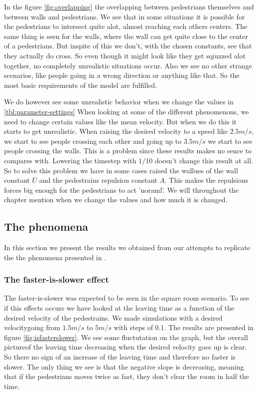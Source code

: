 In the figure \ref{fig:overlapping} the overlapping between pedestrians
themselves and between walls and pedestrians. We see that in some situations
it is possible for the pedestrians to intersect quite alot, almost reaching
each others centers. The same thing is seen for the walls, where the wall
can get quite close to the center of a pedestrians. But inspite of this
we don't, with the chosen constants, see that they actually do cross. So
even though it might look like they get sqiuzzed alot together, no completely
unrealistic situations occur. Also we see no other strange scenarios, like
people going in a wrong direction or anything like that. So the most basic
requirements of the model are fulfilled.

We do however see some unrealistic behavior when we change the values in
\ref{tbl:parameter-settings} When looking at some of the different phenomenons,
we need to change certain values like the mean velocity. But when we do
this it starts to get unrealistic. When raising the desired velocity to
a speed like $2.5m/s$, we start to see people crossing each other and going
up to $3.5m/s$ we start to see people crossing the walls. This is a problem
since these results makes no sence to compares with. Lowering the timestep
with $1/10$ doesn't change this result at all. So to solve this problem we
have in some cases raised the wallues of the wall constant $U$ and the
pedestrains repulsion constant $A$. This makes the repulsions forces
big enough for the pedestrians to act 'noraml'. We will throughout the
chapter mention when we change the values and how much it is changed.

\subsection{The phenomena}\label{subsec:ThePhenomena}
In this section we present the results we obtained from our attempts
to replicate the the phenomena presented in \cite{self-org}.

\subsubsection{The faster-is-slower effect}
The faster-is-slower was expected to be seen in the square room scenario.
To see if this effects occurs we have looked at the leaving time as a function
of the desired velocity of the pedestrains. We made simulations with a desired
velocitygoing from $1.5m/s$ to $5m/s$ with steps of 0.1. The results are presented
in figure \ref{fig:isfasterslower}. We see some fluctutation on the graph, but the
overall pictureof the leaving time decreasing when the desired velocity goes up is
clear. So there no sign of an increase of the leaving time and therefore no faster
is slower. The only thing we see is that the negative slope is decreasing, meaning
that if the pedestrians moves twice as fast, they don't clear the room in half the
time.

